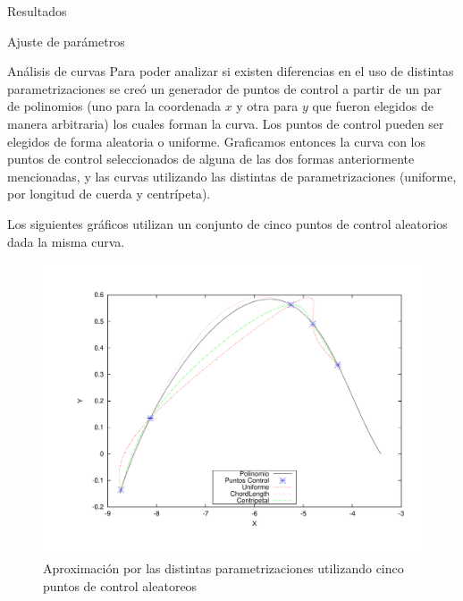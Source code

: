\begin{section}{Resultados}
\begin{subsection}{Ajuste de parámetros}
		\VSP
	\end{subsection}

	\begin{subsection}{Análisis de curvas}
		Para poder analizar si existen diferencias en el uso de distintas parametrizaciones se creó un generador de puntos de control a partir de un par de polinomios (uno para la coordenada $x$ y otra para $y$ que fueron elegidos de manera arbitraria) los cuales forman la curva. Los puntos de control pueden ser elegidos de forma aleatoria o uniforme. Graficamos entonces la curva con los puntos de control seleccionados de alguna de las dos formas anteriormente mencionadas, y las curvas utilizando las distintas de parametrizaciones (uniforme, por longitud de cuerda y centrípeta).
		
		Los siguientes gráficos utilizan un conjunto de cinco puntos de control aleatorios dada la misma curva.
				
		\begin{figure}[H]
		  \centering
			\includegraphics[width=14cm]{graficos/5p.pdf}
		  \caption{Aproximación por las distintas parametrizaciones utilizando cinco puntos de control aleatoreos}
		  \label{fig:5p}
		\end{figure}
		
		\VSP
		

\end{subsection}
\end{section}
